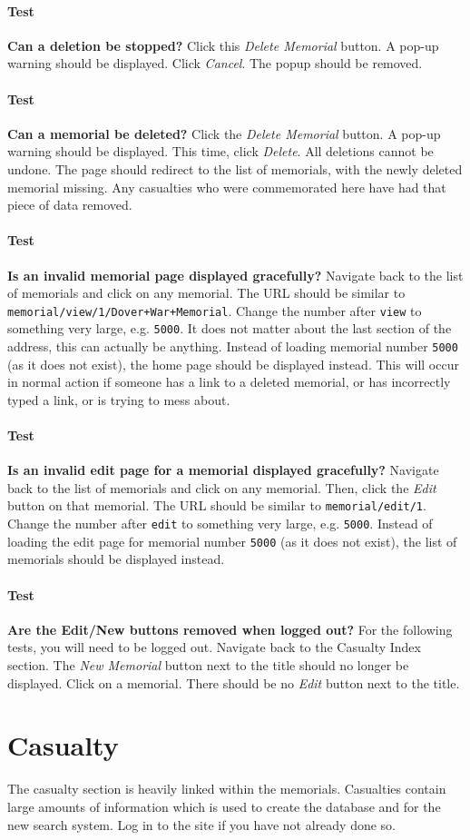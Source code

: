 \documentclass[12pt]{article}
\newcounter{Test}
\newcommand{\test}[1]{%
\stepcounter{Test}%
\paragraph{Test \theTest} \textbf{#1} }
\begin{document}
\test{Can a deletion be stopped?}
Click this \textit{Delete Memorial} button. A pop-up warning should be displayed. Click \textit{Cancel}. The popup should be removed.

\test{Can a memorial be deleted?}
Click the \textit{Delete Memorial} button. A pop-up warning should be displayed. This time, click \textit{Delete}. All deletions cannot be undone. The page should redirect to the list of memorials, with the newly deleted memorial missing. Any casualties who were commemorated here have had that piece of data removed.

\test{Is an invalid memorial page displayed gracefully?}
Navigate back to the list of memorials and click on any memorial. The URL should be similar to \texttt{memorial/view/1/Dover+War+Memorial}. Change the number after \texttt{view} to something very large, e.g. \texttt{5000}. It does not matter about the last section of the address, this can actually be anything. Instead of loading memorial number \texttt{5000} (as it does not exist), the home page should be displayed instead. This will occur in normal action if someone has a link to a deleted memorial, or has incorrectly typed a link, or is trying to mess about.

\test{Is an invalid edit page for a memorial displayed gracefully?}
Navigate back to the list of memorials and click on any memorial. Then, click the \textit{Edit} button on that memorial. The URL should be similar to \texttt{memorial/edit/1}. Change the number after \texttt{edit} to something very large, e.g. \texttt{5000}. Instead of loading the edit page for memorial number \texttt{5000} (as it does not exist), the list of memorials should be displayed instead.

\test{Are the Edit/New buttons removed when logged out?}
For the following tests, you will need to be logged out. Navigate back to the Casualty Index section. The \textit{New Memorial} button next to the title should no longer be displayed. Click on a memorial. There should be no \textit{Edit} button next to the title.

\section{Casualty}\label{sec:casualty}
The casualty section is heavily linked within the memorials. Casualties contain large amounts of information which is used to create the database and for the new search system. Log in to the site if you have not already done so.
\end{document}
